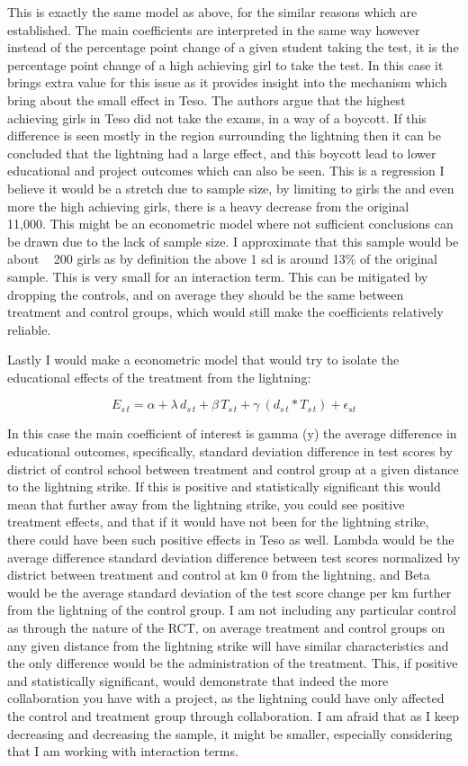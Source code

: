 \documentclass{article}
\begin{document}
This is exactly the same model as above, for the similar reasons which are established. The main coefficients are interpreted in the same way however instead of the percentage point change of a given student taking the test, it is the percentage point change of a high achieving girl to take the test. In this case it brings extra value for this issue as it provides insight into the mechanism which bring about the small effect in Teso. The authors argue that the highest achieving girls in Teso did not take the exams, in a way of a boycott. If this difference is seen mostly in the region surrounding the lightning then it can be concluded that the lightning had a large effect, and this boycott lead to lower educational and project outcomes which can also be seen. This is a regression I believe it would be a stretch due to sample size, by limiting to girls the and even more the high achieving girls, there is a heavy decrease from the original ~ 11,000. This might be an econometric model where not sufficient conclusions can be drawn due to the lack of sample size. I approximate that this sample would be about ~ 200 girls as by definition the above 1 sd is around 13\% of the original sample. This is very small for an interaction term. This can be mitigated by dropping the controls, and on average they should be the same between treatment and control groups, which would still make the coefficients relatively reliable. 

Lastly I would make a econometric model that would try to isolate the educational effects of the treatment from the lightning:

\[ E_{s\,t} = \alpha + \lambda\,d_{s\,t} + \beta\,T_{s\,t} +  \gamma\ (d_{s\,t}* T_{s\,t})+ \epsilon_{s t}\]

In this case the main coefficient of interest is gamma (y) the average difference in educational outcomes, specifically, standard deviation difference in test scores by district of control school between treatment and control group at a given distance to the lightning strike. If this is positive and statistically significant this would mean that further away from the lightning strike, you could see positive treatment effects, and that if it would have not been for the lightning strike, there could have been such positive effects in Teso as well. Lambda would be the average difference standard deviation difference between test scores normalized by district between treatment and control at km 0 from the lightning, and Beta would be the average standard deviation of the test score change per km further from the lightning of the control group. I am not including any particular control as through the nature of the RCT, on average treatment and control groups on any given distance from the lightning strike will have similar characteristics and the only difference would be the administration of the treatment. This, if positive and statistically significant, would demonstrate that indeed the more collaboration you have with a project, as the lightning could have only affected the control and treatment group through collaboration. I am afraid that as I keep decreasing and decreasing the sample, it might be smaller, especially considering that I am working with interaction terms. 
\end{document}
